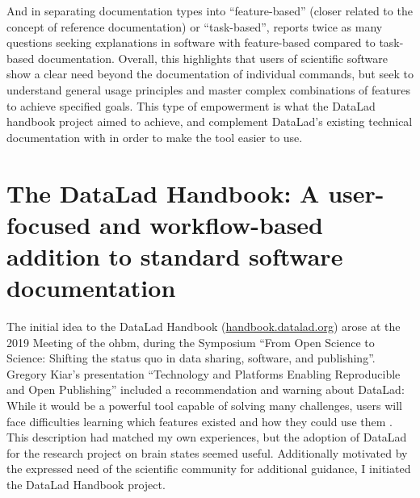 And in separating documentation types into ``feature-based'' (closer related to the concept of reference documentation) or ``task-based'',  \citet{swarts2019open} reports twice as many questions seeking explanations in software with feature-based compared to task-based documentation.
Overall, this highlights that users of scientific software show a clear need beyond the documentation of individual commands, but seek to understand general usage principles and master complex combinations of features to achieve specified goals.
This type of empowerment is what the DataLad handbook project aimed to achieve, and complement DataLad's existing technical documentation with in order to make the tool easier to use.



\section{The DataLad Handbook: A user-focused and workflow-based addition to standard software documentation}

The initial idea to the DataLad Handbook (\href{http://handbook.datalad.org}{handbook.datalad.org}) arose at the 2019 Meeting of the \gls{ohbm}, during the Symposium ``From Open Science to Science: Shifting the status quo in data sharing, software, and publishing''.
Gregory Kiar's presentation ``Technology and Platforms Enabling Reproducible and Open Publishing'' included a recommendation and warning about DataLad: While it would be a powerful tool capable of solving many challenges, users will face difficulties learning which features existed and how they could use them \citep{kiar}.
This description had matched my own experiences, but the adoption of DataLad for the research project on brain states seemed useful.
Additionally motivated by the expressed need of the scientific community for additional guidance, I initiated the DataLad Handbook project.

